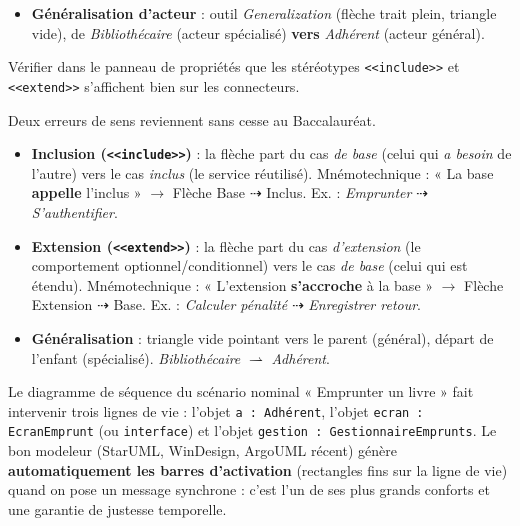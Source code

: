 \documentclass[11pt]{article}
\newcounter{popsec}
\newcounter{popsub}
\newcommand{\courssub}[1]{%
  \stepcounter{popsub}%
  \par\vspace{9pt}\noindent{\popxbold\fontsize{11.5}{13}\selectfont\color{popink}{\color{poporange}\thepopsec.\thepopsub}\hspace{6pt}#1}\par\nopagebreak\vspace{4pt}
}
\begin{document}
\begin{methode}
\begin{enumerate}
\begin{itemize}
      \item \textbf{Généralisation d'acteur} : outil \emph{Generalization} (flèche trait plein, triangle vide), de \emph{Bibliothécaire} (acteur spécialisé) \textbf{vers} \emph{Adhérent} (acteur général).
      \end{itemize}
      Vérifier dans le panneau de propriétés que les stéréotypes \texttt{<<include>>} et \texttt{<<extend>>} s'affichent bien sur les connecteurs.
\end{enumerate}
\end{methode}

\begin{attention}
Deux erreurs de sens reviennent sans cesse au Baccalauréat. 
\begin{itemize}
\item \textbf{Inclusion (\texttt{<<include>>})} : la flèche part du cas \emph{de base} (celui qui \emph{a besoin} de l'autre) vers le cas \emph{inclus} (le service réutilisé). Mnémotechnique : « La base \textbf{appelle} l'inclus » $\rightarrow$ Flèche Base $\dashrightarrow$ Inclus. Ex. : \emph{Emprunter} $\dashrightarrow$ \emph{S'authentifier}.
\item \textbf{Extension (\texttt{<<extend>>})} : la flèche part du cas \emph{d'extension} (le comportement optionnel/conditionnel) vers le cas \emph{de base} (celui qui est étendu). Mnémotechnique : « L'extension \textbf{s'accroche} à la base » $\rightarrow$ Flèche Extension $\dashrightarrow$ Base. Ex. : \emph{Calculer pénalité} $\dashrightarrow$ \emph{Enregistrer retour}.
\item \textbf{Généralisation} : triangle vide pointant vers le parent (général), départ de l'enfant (spécialisé). \emph{Bibliothécaire} $\rightharpoonup$ \emph{Adhérent}.
\end{itemize}
\end{attention}

\courssub{Créer un diagramme de séquence}

Le diagramme de séquence du scénario nominal « Emprunter un livre » fait intervenir trois lignes de vie : l'objet \texttt{a : Adhérent}, l'objet \texttt{ecran : EcranEmprunt} (ou \texttt{interface}) et l'objet \texttt{gestion : GestionnaireEmprunts}. Le bon modeleur (StarUML, WinDesign, ArgoUML récent) génère \textbf{automatiquement les barres d'activation} (rectangles fins sur la ligne de vie) quand on pose un message synchrone : c'est l'un de ses plus grands conforts et une garantie de justesse temporelle.
\end{document}
